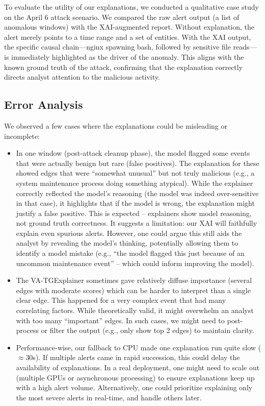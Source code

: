 \documentclass[conference]{IEEEtran}
\begin{document}
To evaluate the utility of our explanations, we conducted a qualitative case study on the April 6 attack scenario. We compared the raw alert output (a list of anomalous windows) with the XAI-augmented report. Without explanation, the alert merely points to a time range and a set of entities. With the XAI output, the specific causal chain—nginx spawning bash, followed by sensitive file reads—is immediately highlighted as the driver of the anomaly. This aligns with the known ground truth of the attack, confirming that the explanation correctly directs analyst attention to the malicious activity. 

\subsection{Error Analysis}
We observed a few cases where the explanations could be misleading or incomplete:
\begin{itemize}
    \item In one window (post-attack cleanup phase), the model flagged some events that were actually benign but rare (false positives). The explanation for these showed edges that were ``somewhat unusual'' but not truly malicious (e.g., a system maintenance process doing something atypical). While the explainer correctly reflected the model's reasoning (the model was indeed over-sensitive in that case), it highlights that if the model is wrong, the explanation might justify a false positive. This is expected -- explainers show model reasoning, not ground truth correctness. It suggests a limitation: our XAI will faithfully explain even spurious alerts. However, one could argue this still aids the analyst by revealing the model's thinking, potentially allowing them to identify a model mistake (e.g., ``the model flagged this just because of an uncommon maintenance event'' -- which could inform improving the model).
    \item The VA-TGExplainer sometimes gave relatively diffuse importance (several edges with moderate scores) which can be harder to interpret than a single clear edge. This happened for a very complex event that had many correlating factors. While theoretically valid, it might overwhelm an analyst with too many ``important'' edges. In such cases, we might need to post-process or filter the output (e.g., only show top 2 edges) to maintain clarity.
    \item Performance-wise, our fallback to CPU made one explanation run quite slow ($\approx$30s). If multiple alerts came in rapid succession, this could delay the availability of explanations. In a real deployment, one might need to scale out (multiple GPUs or asynchronous processing) to ensure explanations keep up with a high alert volume. Alternatively, one could prioritize explaining only the most severe alerts in real-time, and handle others later.
\end{itemize}
\end{document}
